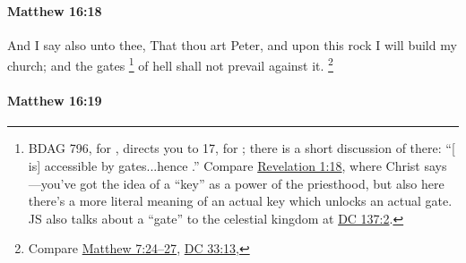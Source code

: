 		\paragraph{Matthew 16:18} %
			\label{MATTHEW-16-18}

			And I say also unto thee, That thou art Peter, and upon this rock I will build my church; and the gates%
				\footnote{%
					BDAG 796, for , directs you to 17, for ; there is a short discussion of  there: ``[ is] accessible by gates...hence .'' Compare \hyperref[REVELATIONNT-1-18]{Revelation 1:18}, where Christ says ---you've got the idea of a ``key'' as a power of the priesthood, but also here there's a more literal meaning of an actual key which unlocks an actual gate. JS also talks about a ``gate'' to the celestial kingdom at \hyperref[DC137-2]{DC 137:2}.
					}
			of hell shall not prevail against it.%
				\footnote{%
					Compare \hyperref[MATTHEW-7-24]{Matthew 7:24--27}, \hyperref[DC33-13]{DC 33:13}, 
					}

			\begin{framed}
			\scriptsize
				\begin{compactdesc}
					\item[SBLG] 
				\end{compactdesc}
			\end{framed}

		\paragraph{Matthew 16:19} %
			\label{MATTHEW-16-19}

